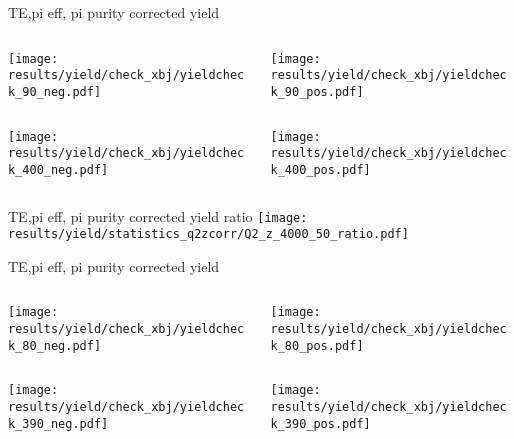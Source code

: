 \begin{frame}{TE,pi eff, pi purity corrected yield}
\begin{columns}
\begin{column}[T]{0.5\textwidth}
\texttt{[image: results/yield/check\_xbj/yieldcheck\_90\_neg.pdf]}
\end{column}
\begin{column}[T]{0.5\textwidth}
\texttt{[image: results/yield/check\_xbj/yieldcheck\_90\_pos.pdf]}
\end{column}
\end{columns}
\begin{columns}
\begin{column}[T]{0.5\textwidth}
\texttt{[image: results/yield/check\_xbj/yieldcheck\_400\_neg.pdf]}
\end{column}
\begin{column}[T]{0.5\textwidth}
\texttt{[image: results/yield/check\_xbj/yieldcheck\_400\_pos.pdf]}
\end{column}
\end{columns}
\end{frame}
\begin{frame}{TE,pi eff, pi purity corrected yield ratio}
\texttt{[image: results/yield/statistics\_q2zcorr/Q2\_z\_4000\_50\_ratio.pdf]}
\end{frame}
\begin{frame}{TE,pi eff, pi purity corrected yield}
\begin{columns}
\begin{column}[T]{0.5\textwidth}
\texttt{[image: results/yield/check\_xbj/yieldcheck\_80\_neg.pdf]}
\end{column}
\begin{column}[T]{0.5\textwidth}
\texttt{[image: results/yield/check\_xbj/yieldcheck\_80\_pos.pdf]}
\end{column}
\end{columns}
\begin{columns}
\begin{column}[T]{0.5\textwidth}
\texttt{[image: results/yield/check\_xbj/yieldcheck\_390\_neg.pdf]}
\end{column}
\begin{column}[T]{0.5\textwidth}
\texttt{[image: results/yield/check\_xbj/yieldcheck\_390\_pos.pdf]}
\end{column}
\end{columns}
\end{frame}
